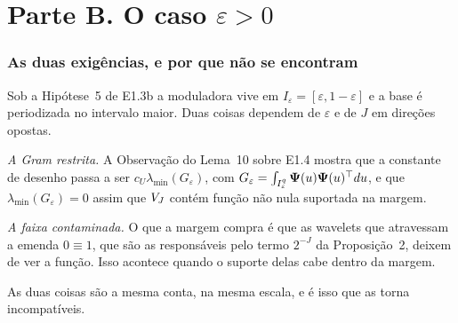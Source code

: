 \documentclass[11pt,a4paper]{article}
\newcommand{\bPsi}{\boldsymbol{\Psi}}
\newcommand{\lmin}{\lambda_{\min}}
\newcommand{\eps}{\varepsilon}
\newcommand{\Ieps}{I_{\eps}}
\begin{document}
\part*{Parte B. O caso $\eps > 0$}

\section{As duas exigências, e por que não se encontram}

Sob a Hipótese~5 de E1.3b a moduladora vive em $\Ieps = [\eps, 1-\eps]$ e a
base é periodizada no intervalo maior. Duas coisas dependem de $\eps$ e de
$J$ em direções opostas.

\emph{A Gram restrita.} A Observação do Lema~10 sobre E1.4 mostra que a
constante de desenho passa a ser $c_{U}\lmin(G_{\eps})$, com
$G_{\eps} = \int_{\Ieps^{q}}\bPsi(u)\bPsi(u)\T du$, e que
$\lmin(G_{\eps}) = 0$ assim que $V_{J}$ contém função não nula suportada na
margem.

\emph{A faixa contaminada.} O que a margem compra é que as wavelets que
atravessam a emenda $0\equiv 1$, que são as responsáveis pelo termo $2^{-J}$
da Proposição~2, deixem de ver a função. Isso acontece quando o suporte delas
cabe dentro da margem.

As duas coisas são a mesma conta, na mesma escala, e é isso que as torna
incompatíveis.
\end{document}
